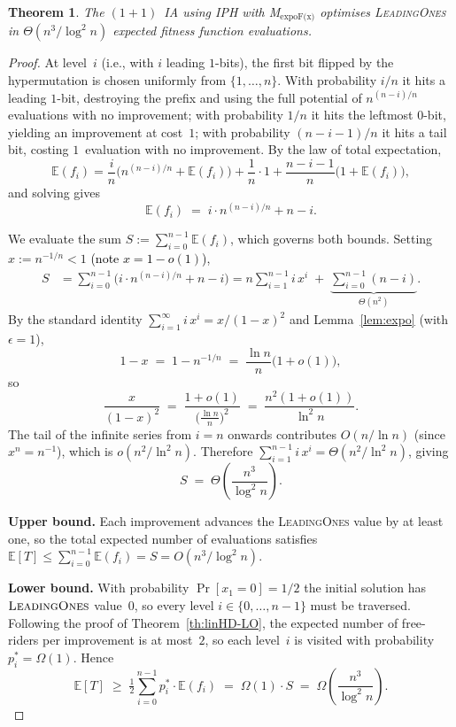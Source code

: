 \documentclass[lettersize,journal]{IEEEtran}
\newcommand{\rerev}[1]{\textcolor{black}{#1}}
\newcommand{\EE}{\mathbb{E}}
\newcommand{\oneoneIA}{$(1+1)$~IA}
\newcommand{\expoF}{M$_{\text{expoF(x)}}$}
\newcommand{\IPHfcm}{IPH}
\newtheorem{theorem}{Theorem}
\begin{document}
\setcounter{theorem}{3}
\begin{theorem} %
The {\oneoneIA } using \IPHfcm{} with {\expoF } optimises
\textsc{LeadingOnes} in $\Theta(n^3/\log^2 n)$ expected fitness function
evaluations.
\end{theorem}

\begin{proof}
At level~$i$ (i.e., with $i$ leading $1$-bits), the first bit flipped by the
hypermutation is chosen uniformly from $\{1,\dots,n\}$.  With probability
$i/n$ it hits a leading $1$-bit, destroying the prefix and using the full
potential of $n^{(n-i)/n}$ evaluations with no improvement; with probability
$1/n$ it hits the leftmost $0$-bit, yielding an improvement at cost~$1$; with
probability $(n-i-1)/n$ it hits a tail bit, costing $1$~evaluation with no
improvement.  By the law of total expectation,
\[
\EE(f_i)
= \frac{i}{n}\bigl(n^{(n-i)/n}+\EE(f_i)\bigr)
  +\frac{1}{n}\cdot 1
  +\frac{n-i-1}{n}\bigl(1+\EE(f_i)\bigr),
\]
and solving gives
\begin{equation}\label{eq:Efi-expoF}
\EE(f_i) \;=\; i\cdot n^{(n-i)/n} + n - i.
\end{equation}

We evaluate the sum
$S := \sum_{i=0}^{n-1} \EE(f_i)$, which governs both bounds.
Setting $x:=n^{-1/n}<1$ \rerev{(note $x=1-o(1)$)},
\begin{align*}
S
&= \sum_{i=0}^{n-1}\bigl(i\cdot n^{(n-i)/n}+n-i\bigr)
 = n\sum_{i=1}^{n-1} i\,x^{i}
   \;+\;\underbrace{\sum_{i=0}^{n-1}(n-i)}_{\Theta(n^2)}.
\end{align*}
By the standard identity $\sum_{i=1}^{\infty} i\,x^i = x/(1-x)^2$
and Lemma~\ref{lem:expo} (with $\epsilon=1$),
\[
1-x \;=\; 1 - n^{-1/n}
    \;=\; \frac{\ln n}{n}\bigl(1+o(1)\bigr),
\]
so
\[
\frac{x}{(1-x)^2}
\;=\; \frac{1+o(1)}{\bigl(\frac{\ln n}{n}\bigr)^2}
\;=\; \frac{n^2(1+o(1))}{\ln^2 n}.
\]
The tail of the infinite series from $i=n$ onwards contributes
$O(n/\ln n)$ (since $x^n = n^{-1}$), which is $o(n^2/\ln^2 n)$.
Therefore $\sum_{i=1}^{n-1} i\,x^{i} = \Theta(n^2/\ln^2 n)$, giving
\begin{equation}\label{eq:S-expoF}
S \;=\; \Theta\!\left(\frac{n^3}{\log^2 n}\right).
\end{equation}

\textbf{Upper bound.}
Each improvement advances the \textsc{LeadingOnes} value by at least one,
so the total expected number of evaluations satisfies
$\EE[T] \le \sum_{i=0}^{n-1} \EE(f_i) = S = O(n^3/\log^2 n)$.

\textbf{Lower bound.}
With probability $\Pr[x_1=0]=1/2$ the initial solution has
$\textsc{LeadingOnes}$ value~$0$, so every level $i\in\{0,\dots,n-1\}$
must be traversed.  Following the proof of Theorem~\ref{th:linHD-LO},
the expected number of free-riders per improvement is at most~$2$,
so each level~$i$ is visited with probability $p_i^*=\Omega(1)$.
Hence
\[
\EE[T]
\;\ge\;
\tfrac{1}{2}\sum_{i=0}^{n-1} p_i^*\cdot \EE(f_i)
\;=\;
\Omega(1)\cdot S
\;=\;
\Omega\!\left(\frac{n^3}{\log^2 n}\right).
\]
\end{proof}
\end{document}
